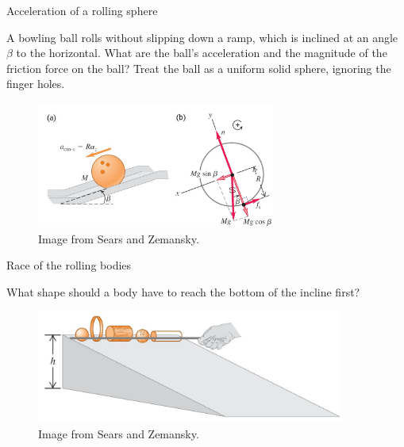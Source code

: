 \documentclass[]{beamer}
\begin{document}





\begin{frame}


  Acceleration of a rolling sphere
  \vspace{7mm}

  A bowling ball rolls without slipping down a ramp, which is
  inclined at an angle $\beta$ to the horizontal. What are the
  ball’s acceleration and the magnitude of the friction force on the
  ball? Treat the ball as a uniform solid sphere, ignoring the finger
  holes.


  \begin{figure}[h!]  
    \includegraphics[width=0.7\textwidth]{images/11.jpg}
    \caption{Image from Sears and Zemansky. }
  \end{figure}


\end{frame}


\begin{frame}


  Race of the rolling bodies
  \vspace{7mm}

  What shape should a body have to reach the bottom of the
  incline first?


  
  \begin{figure}[h!]  
    \includegraphics[width=0.9\textwidth]{images/10.jpg}
    \caption{Image from Sears and Zemansky.}
  \end{figure}

\end{frame}
\end{document}
